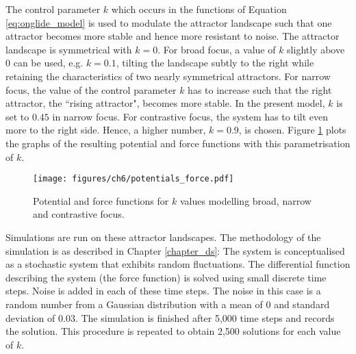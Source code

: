 The control parameter $k$ which occurs in the functions of Equation \ref{eq:onglide_model} is used to modulate the attractor landscape such that one attractor becomes more stable and hence more resistant to noise. The attractor landscape is symmetrical with $k=0$. For broad focus, a value of $k$ slightly above $0$ can be used, e.g. $k=0.1$, tilting the landscape subtly to the right while retaining the characteristics of two nearly symmetrical attractors. For narrow focus, the value of the control parameter $k$ has to increase such that the right attractor, the ``rising attractor", becomes more stable. In the present model, $k$ is set to $0.45$ in narrow focus. For contrastive focus, the system has to tilt even more to the right side. Hence, a higher number, $k=0.9$, is chosen. Figure \ref{fig:potentials_force_br_na_co} plots the graphs of the resulting potential and force functions with this parametrisation of $k$.

\begin{figure}
\texttt{[image: figures/ch6/potentials\_force.pdf]}
\caption{Potential and force functions for $k$ values modelling broad, narrow and contrastive focus.}
\label{fig:potentials_force_br_na_co}
\end{figure}

Simulations are run on these attractor landscapes. The methodology of the simulation is as described in Chapter \ref{chapter_ds}: The system is conceptualised as a stochastic system that exhibits random fluctuations. The differential function describing the system (the force function) is solved using small discrete time steps. Noise is added in each of these time steps. The noise in this case is a random number from a Gaussian distribution with a mean of $0$ and standard deviation of $0.03$. The simulation is finished after 5,000 time steps and records the solution. This procedure is repeated to obtain 2,500 solutions for each value of $k$.

